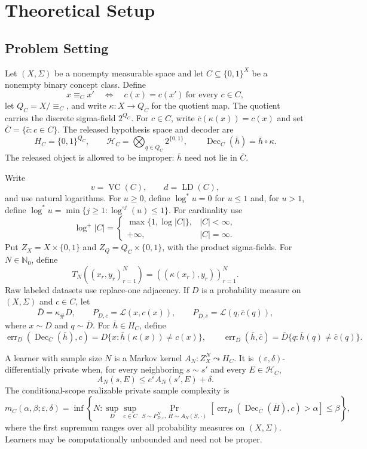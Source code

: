 \section{Theoretical Setup}\label{sec:setup}

\subsection{Problem Setting}
Let $(X,\Sigma)$ be a nonempty measurable space and let
$C\subseteq\{0,1\}^{X}$ be a nonempty binary concept class.  Define
\[
x\equiv_C x'\quad\Longleftrightarrow\quad
c(x)=c(x')\ \text{for every }c\in C,
\]
let $Q_C=X/{\equiv_C}$, and write $\kappa:X\to Q_C$ for the quotient map.
The quotient carries the discrete sigma-field $2^{Q_C}$.  For $c\in C$,
write $\bar c(\kappa(x))=c(x)$ and set
$\bar C=\{\bar c:c\in C\}$.  The released hypothesis space and decoder are
\[
 H_C=\{0,1\}^{Q_C},\qquad
 \mathcal H_C=\bigotimes_{q\in Q_C}2^{\{0,1\}},\qquad
 \operatorname{Dec}_C(\bar h)=\bar h\circ\kappa .
\]
The released object is allowed to be improper: $\bar h$ need not lie in
$\bar C$.

Write
\[
 v=\operatorname{VC}(C),\qquad d=\operatorname{LD}(C),
\]
and use natural logarithms.  For $u\ge0$, define $\log^*u=0$ for
$u\le1$ and, for $u>1$, define
$\log^*u=\min\{j\ge1:\log^{\circ j}(u)\le1\}$.  For cardinality use
\[
\log^+|C|=\begin{cases}\max\{1,\log|C|\},&|C|<\infty,\\
 +\infty,&|C|=\infty.
 \end{cases}
\]
Put $Z_X=X\times\{0,1\}$ and $Z_Q=Q_C\times\{0,1\}$, with the product
sigma-fields.  For $N\in\mathbb N_0$, define
\[
 T_N((x_r,y_r)_{r=1}^{N})=((\kappa(x_r),y_r))_{r=1}^{N}.
\]
Raw labeled datasets use replace-one adjacency.  If $D$ is a probability
measure on $(X,\Sigma)$ and $c\in C$, let
\[
 \bar D=\kappa_\#D,\qquad
 P_{D,c}=\mathcal L(x,c(x)),\qquad
 P_{\bar D,\bar c}=\mathcal L(q,\bar c(q)),
\]
where $x\sim D$ and $q\sim\bar D$.  For $\bar h\in H_C$, define
\[
 \operatorname{err}_D(\operatorname{Dec}_C(\bar h),c)
 =D\{x:\bar h(\kappa(x))\ne c(x)\},\qquad
 \operatorname{err}_{\bar D}(\bar h,\bar c)
 =\bar D\{q:\bar h(q)\ne\bar c(q)\}.
\]

A learner with sample size $N$ is a Markov kernel
$A_N:Z_X^N\leadsto H_C$.  It is $(\varepsilon,\delta)$-differentially
private when, for every neighboring $s\sim s'$ and every
$E\in\mathcal H_C$,
\[
 A_N(s,E)\le e^{\varepsilon}A_N(s',E)+\delta .
\]
The conditional-scope realizable private sample complexity is
\[
 m_C(\alpha,\beta;\varepsilon,\delta)=\inf\left\{N:
 \sup_D\sup_{c\in C}\Pr_{S\sim P_{D,c}^{N},\,\bar H\sim A_N(S,\cdot)}
 [\operatorname{err}_D(\operatorname{Dec}_C(\bar H),c)>\alpha]\le\beta\right\},
\]
where the first supremum ranges over all probability measures on $(X,\Sigma)$.
Learners may be computationally unbounded and need not be proper.

